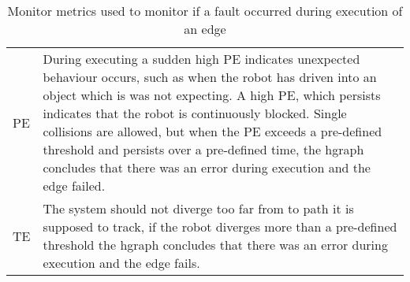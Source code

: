 \begin{table}[htb!]
\centering
\begin{tabular}[t]{l p{10cm}}
  \acf{PE}&  During executing a sudden high \ac{PE} indicates unexpected behaviour occurs, such as when the robot has driven into an object which is was not expecting. A high \ac{PE}, which persists indicates that the robot is continuously blocked. Single collisions are allowed, but when the \ac{PE} exceeds a pre-defined threshold and persists over a pre-defined time, the \ac{hgraph} concludes that there was an error during execution and the edge failed.\\
  \acf{TE}& The system should not diverge too far from to path it is supposed to track, if the robot diverges more than a pre-defined threshold the \ac{hgraph} concludes that there was an error during execution and the edge fails. \\
\end{tabular}
\caption{Monitor metrics used to monitor if a fault occurred during execution of an edge}%
\label{table:monitoring_edge_metrics}
\end{table}

